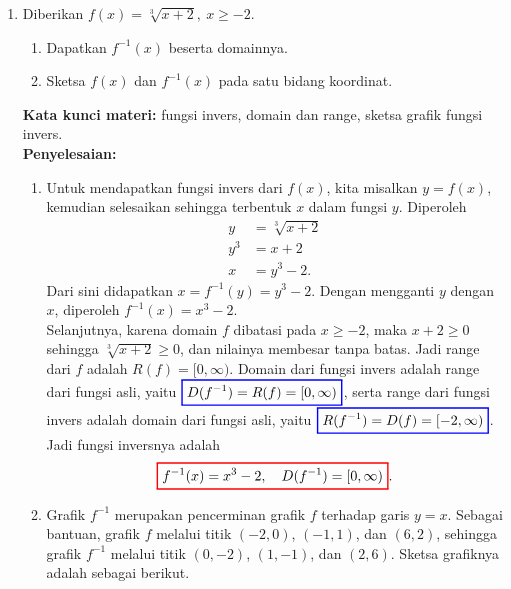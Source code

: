 \documentclass[10pt,openany,a4paper]{article}
\theoremstyle{definition}
\theoremstyle{definition}
\theoremstyle{plain}
\newenvironment{jawab}[2][tes]{%
\par\noindent\textbf{Kata kunci materi:} #1.\\
\textbf{Penyelesaian:} #2%
}{}
\begin{document}
\begin{enumerate}
    \item Diberikan $f(x)=\sqrt[3]{x+2},\ x\geq -2$.
    \begin{enumerate}
        \item Dapatkan $f^{-1}(x)$ beserta domainnya.
        \item Sketsa $f(x)$ dan $f^{-1}(x)$ pada satu bidang koordinat.
    \end{enumerate}
    \begin{jawab}[fungsi invers, domain dan range, sketsa grafik fungsi invers]{
        \begin{enumerate}
            \item Untuk mendapatkan fungsi invers dari $f(x)$, kita misalkan $y=f(x)$, kemudian selesaikan sehingga terbentuk $x$ dalam fungsi $y$. Diperoleh
            \begin{align*}
                y &= \sqrt[3]{x+2}\\
                y^3 &= x+2\\
                x &= y^3 - 2.
            \end{align*}
            Dari sini didapatkan $x = f^{-1}(y) = y^3 - 2$. Dengan mengganti $y$ dengan $x$, diperoleh $f^{-1}(x) = x^3 - 2$.\\
            Selanjutnya, karena domain $f$ dibatasi pada $x\geq -2$, maka $x+2\geq 0$ sehingga $\sqrt[3]{x+2}\geq 0$, dan nilainya membesar tanpa batas. Jadi range dari $f$ adalah $R(f)=[0,\infty)$. Domain dari fungsi invers adalah range dari fungsi asli, yaitu $\colorlet{oldcolor}{.}
        \color{blue}
        \setlength{\fboxrule}{1pt} \boxed{\color{oldcolor}D(f^{-1}) = R(f) = [0, \infty)}\color{oldcolor}$, serta range dari fungsi invers adalah domain dari fungsi asli, yaitu $\colorlet{oldcolor}{.}
        \color{blue}
        \setlength{\fboxrule}{1pt} \boxed{\color{oldcolor}R(f^{-1}) = D(f) = [-2, \infty)}\color{oldcolor}$. Jadi fungsi inversnya adalah
            \begin{align*}
                \colorlet{oldcolor}{.}
        \color{red}
        \setlength{\fboxrule}{1pt} \boxed{\color{oldcolor}f^{-1}(x) = x^3 - 2,\quad D(f^{-1})=[0,\infty)}\color{oldcolor}.
            \end{align*}
            \item Grafik $f^{-1}$ merupakan pencerminan grafik $f$ terhadap garis $y=x$. Sebagai bantuan, grafik $f$ melalui titik $(-2,0)$, $(-1,1)$, dan $(6,2)$, sehingga grafik $f^{-1}$ melalui titik $(0,-2)$, $(1,-1)$, dan $(2,6)$. Sketsa grafiknya adalah sebagai berikut.
            \begin{center}

\end{center}
\end{enumerate}}
\end{jawab}
\end{enumerate}
\end{document}
